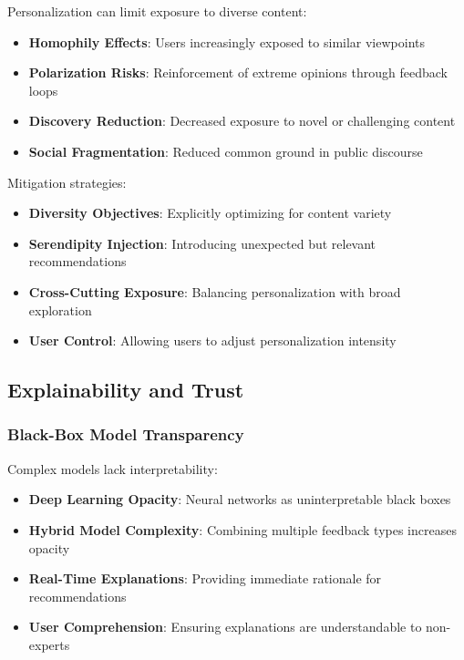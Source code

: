 Personalization can limit exposure to diverse content:

\begin{itemize}
    \item \textbf{Homophily Effects}: Users increasingly exposed to similar viewpoints
    \item \textbf{Polarization Risks}: Reinforcement of extreme opinions through feedback loops
    \item \textbf{Discovery Reduction}: Decreased exposure to novel or challenging content
    \item \textbf{Social Fragmentation}: Reduced common ground in public discourse
\end{itemize}

Mitigation strategies:
\begin{itemize}
    \item \textbf{Diversity Objectives}: Explicitly optimizing for content variety
    \item \textbf{Serendipity Injection}: Introducing unexpected but relevant recommendations
    \item \textbf{Cross-Cutting Exposure}: Balancing personalization with broad exploration
    \item \textbf{User Control}: Allowing users to adjust personalization intensity
\end{itemize}

\subsection{Explainability and Trust}

\subsubsection{Black-Box Model Transparency}

Complex models lack interpretability:

\begin{itemize}
    \item \textbf{Deep Learning Opacity}: Neural networks as uninterpretable black boxes
    \item \textbf{Hybrid Model Complexity}: Combining multiple feedback types increases opacity
    \item \textbf{Real-Time Explanations}: Providing immediate rationale for recommendations
    \item \textbf{User Comprehension}: Ensuring explanations are understandable to non-experts
\end{itemize}

